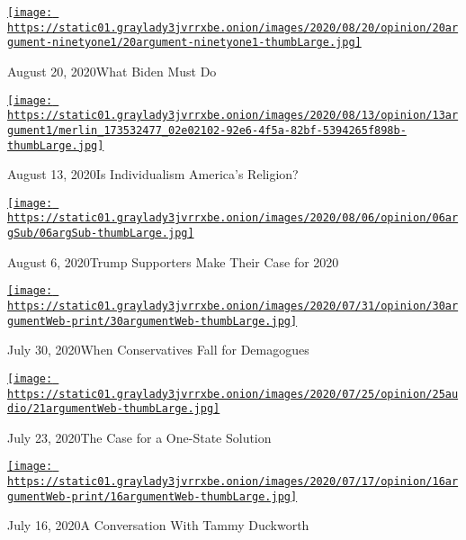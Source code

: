 \href{https://www.nytimes3xbfgragh.onion/2020/08/20/opinion/the-argument-democratic-convention-biden.html?action=click\&module=audio-series-bar\&region=header\&pgtype=Article}{\texttt{[image: https://static01.graylady3jvrrxbe.onion/images/2020/08/20/opinion/20argument-ninetyone1/20argument-ninetyone1-thumbLarge.jpg]}}

August 20, 2020What Biden Must Do

\href{https://www.nytimes3xbfgragh.onion/2020/08/13/opinion/the-argument-coronavirus-catholic-covid.html?action=click\&module=audio-series-bar\&region=header\&pgtype=Article}{\texttt{[image: https://static01.graylady3jvrrxbe.onion/images/2020/08/13/opinion/13argument1/merlin\_173532477\_02e02102-92e6-4f5a-82bf-5394265f898b-thumbLarge.jpg]}}

August 13, 2020Is Individualism America's Religion?

\href{https://www.nytimes3xbfgragh.onion/2020/08/06/opinion/the-argument-trump-coronavirus-election.html?action=click\&module=audio-series-bar\&region=header\&pgtype=Article}{\texttt{[image: https://static01.graylady3jvrrxbe.onion/images/2020/08/06/opinion/06argSub/06argSub-thumbLarge.jpg]}}

August 6, 2020Trump Supporters Make Their Case for 2020

\href{https://www.nytimes3xbfgragh.onion/2020/07/30/opinion/the-argument-authoritarianism-anne-applebaum.html?action=click\&module=audio-series-bar\&region=header\&pgtype=Article}{\texttt{[image: https://static01.graylady3jvrrxbe.onion/images/2020/07/31/opinion/30argumentWeb-print/30argumentWeb-thumbLarge.jpg]}}

July 30, 2020When Conservatives Fall for Demagogues

\href{https://www.nytimes3xbfgragh.onion/2020/07/23/opinion/the-argument-israel-palestinian.html?action=click\&module=audio-series-bar\&region=header\&pgtype=Article}{\texttt{[image: https://static01.graylady3jvrrxbe.onion/images/2020/07/25/opinion/25audio/21argumentWeb-thumbLarge.jpg]}}

July 23, 2020The Case for a One-State Solution

\href{https://www.nytimes3xbfgragh.onion/2020/07/16/opinion/the-argument-tammy-duckworth.html?action=click\&module=audio-series-bar\&region=header\&pgtype=Article}{\texttt{[image: https://static01.graylady3jvrrxbe.onion/images/2020/07/17/opinion/16argumentWeb-print/16argumentWeb-thumbLarge.jpg]}}

July 16, 2020A Conversation With Tammy Duckworth

